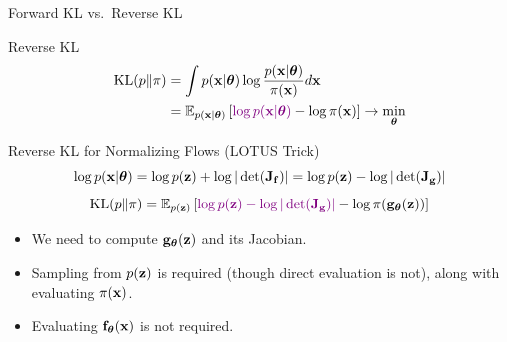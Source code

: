 \documentclass{beamer}
\begin{document}
\begin{frame}{Forward KL vs.\ Reverse KL}
	\begin{block}{Reverse KL}
	  	\vspace{-0.5cm}
			\begin{align*}
				\mathrm{KL}(p \| \pi) &= \int p(\mathbf{x} | \boldsymbol{\theta}) \log \frac{p(\mathbf{x} | \boldsymbol{\theta})}{\pi(\mathbf{x})} d \mathbf{x} \\
				&= \mathbb{E}_{p(\mathbf{x} | \boldsymbol{\theta})} \left[{\color{violet}\log p(\mathbf{x} | \boldsymbol{\theta})} - \log \pi(\mathbf{x})\right] \rightarrow \min_{\boldsymbol{\theta}}
			\end{align*}
		\vspace{-0.7cm}
	\end{block}
    
	\begin{block}{Reverse KL for Normalizing Flows (LOTUS Trick)}
  		\vspace{-0.3cm}
		\[
			 \log p(\mathbf{x} | \boldsymbol{\theta}) = \log p(\mathbf{z}) +  \log  |\det (\mathbf{J}_{\mathbf{f}})| = \log p(\mathbf{z}) - \log |\det (\mathbf{J}_{\mathbf{g}})| 
		\]
		\[
			\mathrm{KL}(p \| \pi)  = \mathbb{E}_{p(\mathbf{z})} \left[ {\color{violet} \log p(\mathbf{z}) -  \log |\det (\mathbf{J}_{\mathbf{g}})| } - \log \pi(\mathbf{g}_{\boldsymbol{\theta}}(\mathbf{z})) \right]
		\]
		\vspace{-0.3cm}
		
		\begin{itemize}
			\item We need to compute $\mathbf{g}_{\boldsymbol{\theta}}(\mathbf{z})$ and its Jacobian.
			\item Sampling from $p(\mathbf{z})$ is required (though direct evaluation is not), along with evaluating $\pi(\mathbf{x})$.
			\item Evaluating $\mathbf{f}_{\boldsymbol{\theta}}(\mathbf{x})$ is not required.
		\end{itemize}
	\end{block}
\end{frame}
\end{document}
